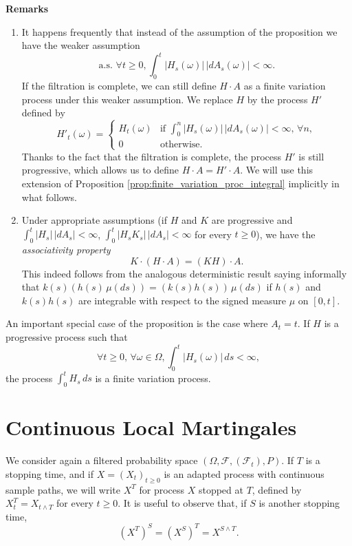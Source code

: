 \documentclass[../Main.tex]{subfiles}
\begin{document}
\textbf{Remarks}
\begin{enumerate}
    \item[(i)] It happens frequently that instead of the assumption of the proposition we have the weaker assumption
    \[ \text{a.s. } \forall t \geq 0, \int_0^t |H_s(\omega)| \, |dA_s(\omega)| < \infty. \]
    If the filtration is complete, we can still define $H \cdot A$ as a finite variation process under this weaker assumption. We replace $H$ by the process $H'$ defined by
    \[
    H'_t(\omega) = \begin{cases}
    H_t(\omega) & \text{if } \int_0^n |H_s(\omega)| \, |dA_s(\omega)| < \infty, \, \forall n, \\
    0 & \text{otherwise.}
    \end{cases}
    \]
    Thanks to the fact that the filtration is complete, the process $H'$ is still progressive, which allows us to define $H \cdot A = H' \cdot A$. We will use this extension of Proposition \ref{prop:finite_variation_proc_integral} implicitly in what follows.
    \item[(ii)] Under appropriate assumptions (if $H$ and $K$ are progressive and $\int_0^t |H_s| \, |dA_s| < \infty$, $\int_0^t |H_s K_s| \, |dA_s| < \infty$ for every $t \geq 0$), we have the \textit{associativity property}
    \begin{equation*}
    K \cdot (H \cdot A) = (KH) \cdot A.
    \end{equation*}
    This indeed follows from the analogous deterministic result saying informally that $k(s) (h(s) \, \mu(ds)) = (k(s)h(s)) \, \mu(ds)$ if $h(s)$ and $k(s)h(s)$ are integrable with respect to the signed measure $\mu$ on $[0, t]$.
\end{enumerate}

An important special case of the proposition is the case where $A_t = t$. If $H$ is a progressive process such that
$$
\forall t \geq 0, \, \forall \omega \in \Omega, \int_0^t |H_s(\omega)| \, ds < \infty,
$$
the process $\int_0^t H_s \, ds$ is a finite variation process.

\section{Continuous Local Martingales}
We consider again a filtered probability space $(\Omega, \mathcal{F}, (\mathcal{F}_t), P)$. If $T$ is a stopping time, and if $X = (X_t)_{t \ge 0}$ is an adapted process with continuous sample paths, we will write $X^T$ for process $X$ stopped at $T$, defined by $X_t^T = X_{t \wedge T}$ for every $t \ge 0$. It is useful to observe that, if $S$ is another stopping time,
\[
(X^T)^S = (X^S)^T = X^{S \wedge T}.
\]
\end{document}
